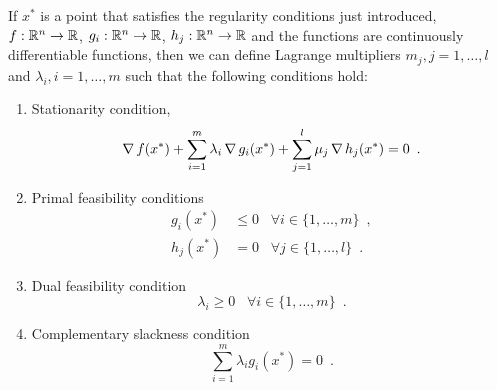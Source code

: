 If $x^*$ is a point that satisfies the regularity conditions just introduced, $f: \mathbb{R}^n \rightarrow
	\mathbb{R}$, $g_i: \mathbb{R}^n \rightarrow \mathbb{R}$, $h_j: \mathbb{R}^n \rightarrow \mathbb{R}$ and the functions are continuously
differentiable functions, then we can define Lagrange multipliers $m_j, j = 1, \ldots, l$ and
$\lambda_i, i = 1, \ldots, m$ such that the following conditions hold:
\begin{enumerate}
	\item Stationarity condition,
	      \begin{equation*}
		      \operatorname*{\nabla}{f(x^*)} + \sum_{i = 1}^m{\lambda_i\operatorname*{\nabla}{g_i(x^*)}} + \sum_{j =
			      1}^l{\mu_j\operatorname*{\nabla}{h_j(x^*)}} = 0 \enspace.
	      \end{equation*}
	\item Primal feasibility conditions
	      \begin{equation*}
		      \begin{aligned}
			      g_i(x^*) & \leq 0 \hspace{10pt} \forall i \in \{1, \ldots, m\}
			      \enspace,                                                             \\
			      h_j(x^*) & = 0 \hspace{10pt} \forall j \in \{1, \ldots, l\} \enspace.
		      \end{aligned}
	      \end{equation*}
	\item Dual feasibility condition
	      \begin{equation*}
		      \lambda_i \geq 0 \hspace{10pt} \forall i \in \{1, \ldots, m\} \enspace.
	      \end{equation*}
	\item Complementary slackness condition
	      \begin{equation*}
		      \sum_{i = 1}^m \lambda_i g_i(x^*) = 0 \enspace.
	      \end{equation*}
\end{enumerate}
